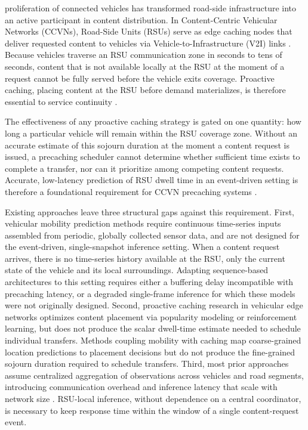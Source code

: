 \documentclass[journal]{IEEEtran}
\begin{document}
 proliferation of connected vehicles has transformed road-side
infrastructure into an active participant in content distribution.
In Content-Centric Vehicular Networks (CCVNs), Road-Side Units (RSUs) serve as
edge caching nodes that deliver requested content to vehicles via
Vehicle-to-Infrastructure (V2I) links \cite{1,3,45}.
Because vehicles traverse an RSU communication zone in seconds to tens of seconds,
content that is not available locally at the RSU at the moment of a request cannot
be fully served before the vehicle exits coverage.
Proactive caching, placing content at the RSU before demand materializes, is therefore
essential to service continuity \cite{32,33,39}.

The effectiveness of any proactive caching strategy is gated on one quantity:
how long a particular vehicle will remain within the RSU coverage zone.
Without an accurate estimate of this sojourn duration at the moment a content request
is issued, a precaching scheduler cannot determine whether sufficient time exists
to complete a transfer, nor can it prioritize among competing content requests.
Accurate, low-latency prediction of RSU dwell time in an event-driven setting
is therefore a foundational requirement for CCVN precaching systems \cite{42,51}.

Existing approaches leave three structural gaps against this requirement.
First, vehicular mobility prediction methods \cite{41,43} require continuous
time-series inputs assembled from periodic, globally collected sensor data,
and are not designed for the event-driven, single-snapshot inference setting.
When a content request arrives, there is no time-series history available at the RSU,
only the current state of the vehicle and its local surroundings.
Adapting sequence-based architectures to this setting requires either a buffering delay
incompatible with precaching latency, or a degraded single-frame inference for which
these models were not originally designed.
Second, proactive caching research in vehicular edge networks \cite{47,48,49}
optimizes content placement via popularity modeling or reinforcement learning,
but does not produce the scalar dwell-time estimate needed to schedule individual
transfers. Methods coupling mobility with caching \cite{35,36} map coarse-grained
location predictions to placement decisions but do not produce the fine-grained
sojourn duration required to schedule transfers.
Third, most prior approaches assume centralized aggregation of observations across
vehicles and road segments, introducing communication overhead and inference latency
that scale with network size \cite{61,64}.
RSU-local inference, without dependence on a central coordinator, is necessary
to keep response time within the window of a single content-request event.
\end{document}
